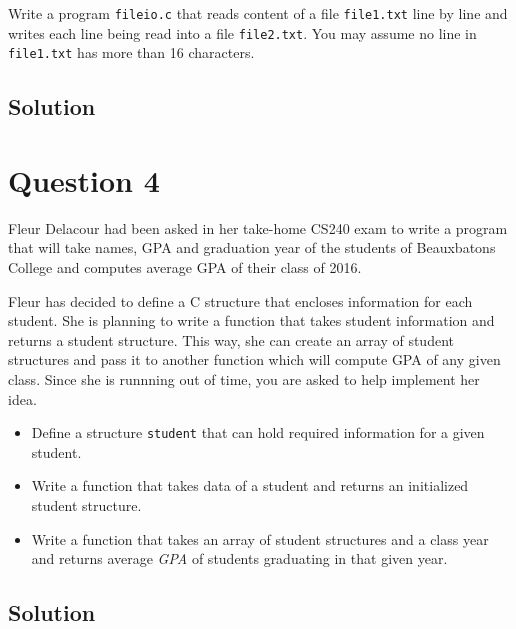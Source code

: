 \documentclass[12pt,letterpaper,twoside]{article}
\begin{document}
Write a program \texttt{fileio.c} that reads content of a file \texttt{file1.txt} line by line and writes each line being read into a file \texttt{file2.txt}.
You may assume no line in \texttt{file1.txt} has more than 16 characters.

\subsection*{Solution}

\lstset{language=c,tabsize=4}


\section*{Question 4}

Fleur Delacour had been asked in her take-home CS240 exam to write a program that will take names, GPA and graduation year of the students of Beauxbatons College and computes average GPA of their class of 2016.

Fleur has decided to define a C structure that encloses information for each student.
She is planning to write a function that takes student information and returns a student structure.
This way, she can create an array of student structures and pass it to another function which will compute GPA of any given class.
Since she is runnning out of time, you are asked to help implement her idea.

\begin{itemize}
\item Define a structure \texttt{student} that can hold required information for a given student.
\item Write a function that takes data of a student and returns an initialized student structure.
\item Write a function that takes an array of student structures and a class year and returns average \textit{GPA} of students graduating in that given year.
\end{itemize}

\subsection*{Solution}
\end{document}
